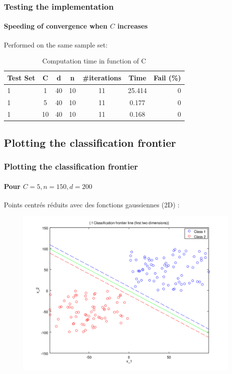 \documentclass{beamer}
\begin{document}
\begin{frame}
\frametitle{Testing the implementation}
\framesubtitle{Speeding of convergence when $C$ increases}

Performed on the same sample set:\\

         \begin{center}
                \begin{table}
                \caption{Computation time in function of C}
                \begin{tabular}{| l | c | c | c | c | c | r |}
                \hline
                Test Set & C & d & n & \#iterations & Time & Fail (\%)\\ \hline
                1 & 1 & 40 & 10 & 11 & 25.414 & 0\\ \hline
                1 & 5 & 40 & 10 & 11 & 0.177 & 0\\ \hline
                1 & 10 & 40 & 10 & 11 & 0.168 & 0\\ \hline
                \end{tabular}
                \end{table}
         \end{center}

\end{frame}

\subsection{Plotting the classification frontier}

\begin{frame}
\tableofcontents[currentsubsection]
\end{frame}

\begin{frame}
\frametitle{Plotting the \textbf{classification frontier}}
\framesubtitle{Pour $C = 5, n = 150, d = 200$}

Points centrés réduits avec des fonctions gaussiennes (2D) :

         \begin{figure}
         \centering
         \includegraphics[scale=0.4]{images/line4.png}
         \end{figure}

\end{frame}
\end{document}
